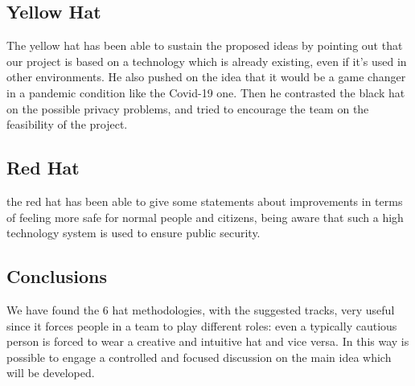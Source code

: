 \documentclass[../main.tex]{subfiles}
\begin{document}
    \subsection{Yellow Hat}\label{subsec:yellow-hat}
    The yellow hat has been able to sustain the proposed ideas by pointing out that our project is based on a technology which is already existing,
    even if it’s used in other environments.
    He also pushed on the idea that it would be a game changer in a pandemic condition like the Covid-19 one.
    Then he contrasted the black hat on the possible privacy problems, and tried to encourage the team on the feasibility of the project.

    \subsection{Red Hat}\label{subsec:red-hat}
    the red hat has been able to give some statements about improvements in terms of feeling more safe for normal people and citizens,
    being aware that such a high technology system is used to ensure public security.\\

    \subsection{Conclusions}\label{subsec:conclusions}
    We have found the 6 hat methodologies, with the suggested tracks, very useful since it forces people in a team to play different roles:
    even a typically cautious person is forced to wear a creative and intuitive hat and vice versa.
    In this way is possible to engage a controlled and focused discussion on the main idea which will be developed.
\end{document}
